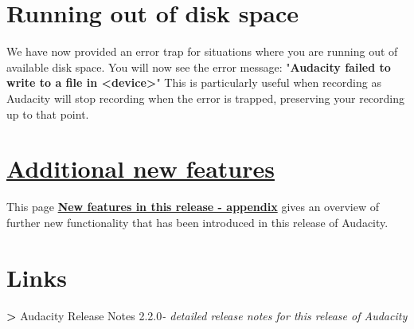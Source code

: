 \begin{multicols}{2}
\section{Running out of disk space}We have now provided an error trap for situations where you are running out of available disk space.
You will now see the error message:
"\textbf{Audacity failed to write to a file in <device>}"
This is particularly useful when recording as Audacity will stop recording when the error is trapped, preserving your recording up to that point.

\label{newXfeaturesXinXthisXreleaseXappendix}
\section{
\hyperref[\foo{newXfeaturesXinXthisXreleaseXappendixX}]{Additional new features}
}This page \textbf{
\hyperref[\foo{newXfeaturesXinXthisXreleaseXappendixX}]{New features in this release - appendix}
} gives an overview of further new functionality that has been introduced in this release of Audacity.

\section{Links}\textbf{>} Audacity Release Notes 2.2.0\textit{- detailed release notes for this release of Audacity}\end{multicols}